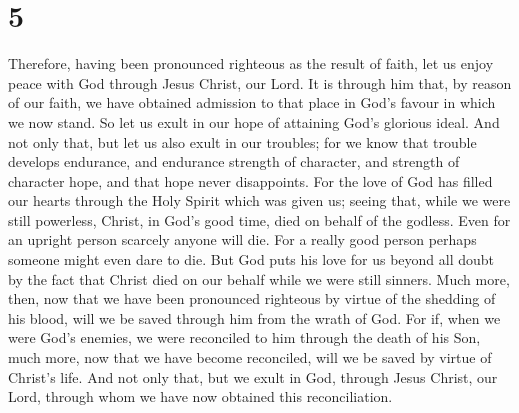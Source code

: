 \hypertarget{section-4}{%
\section{5}\label{section-4}}

 Therefore, having been pronounced righteous as the result
of faith, let us enjoy peace with God through Jesus Christ, our Lord.
 It is through him that, by reason of our faith, we have
obtained admission to that place in God's favour in which we now stand.
So let us exult in our hope of attaining God's glorious ideal.
 And not only that, but let us also exult in our troubles;
 for we know that trouble develops endurance, and endurance
strength of character, and strength of character hope,  and
that hope never disappoints. For the love of God has filled our hearts
through the Holy Spirit which was given us;  seeing that,
while we were still powerless, Christ, in God's good time, died on
behalf of the godless.  Even for an upright person scarcely
anyone will die. For a really good person perhaps someone might even
dare to die.  But God puts his love for us beyond all doubt
by the fact that Christ died on our behalf while we were still sinners.
 Much more, then, now that we have been pronounced righteous
by virtue of the shedding of his blood, will we be saved through him
from the wrath of God.  For if, when we were God's enemies,
we were reconciled to him through the death of his Son, much more, now
that we have become reconciled, will we be saved by virtue of Christ's
life.  And not only that, but we exult in God, through
Jesus Christ, our Lord, through whom we have now obtained this
reconciliation.

